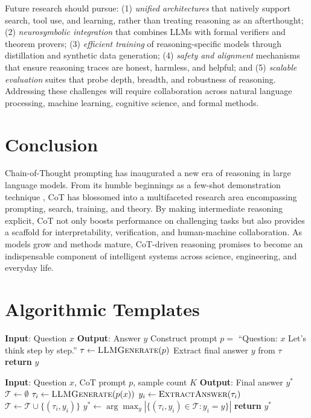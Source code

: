 \documentclass[11pt,a4paper]{article}
\begin{document}
Future research should pursue: (1) \textit{unified architectures} that natively support search, tool use, and learning, rather than treating reasoning as an afterthought; (2) \textit{neurosymbolic integration} that combines LLMs with formal verifiers and theorem provers; (3) \textit{efficient training} of reasoning-specific models through distillation and synthetic data generation; (4) \textit{safety and alignment} mechanisms that ensure reasoning traces are honest, harmless, and helpful; and (5) \textit{scalable evaluation} suites that probe depth, breadth, and robustness of reasoning. Addressing these challenges will require collaboration across natural language processing, machine learning, cognitive science, and formal methods.

\section{Conclusion}
\label{sec:conclusion}
Chain-of-Thought prompting has inaugurated a new era of reasoning in large language models. From its humble beginnings as a few-shot demonstration technique \citep{wei2022chain}, CoT has blossomed into a multifaceted research area encompassing prompting, search, training, and theory. By making intermediate reasoning explicit, CoT not only boosts performance on challenging tasks but also provides a scaffold for interpretability, verification, and human-machine collaboration. As models grow and methods mature, CoT-driven reasoning promises to become an indispensable component of intelligent systems across science, engineering, and everyday life.




\appendix
\section{Algorithmic Templates}
\begin{algorithm}[h]
\caption{Zero-Shot Chain-of-Thought Prompting}
\label{alg:zero-shot-cot}
\begin{algorithmic}[1]
\State \textbf{Input}: Question $x$
\State \textbf{Output}: Answer $y$
\State Construct prompt $p = $ ``Question: $x$ Let's think step by step.''
\State $\tau \gets \textsc{LLMGenerate}(p)$
\State Extract final answer $y$ from $\tau$
\State \textbf{return} $y$
\end{algorithmic}
\end{algorithm}

\begin{algorithm}[h]
\caption{Self-Consistency with Majority Voting}
\label{alg:self-consistency}
\begin{algorithmic}[1]
\State \textbf{Input}: Question $x$, CoT prompt $p$, sample count $K$
\State \textbf{Output}: Final answer $y^*$
\State $\mathcal{T} \gets \emptyset$
  \State $\tau_i \gets \textsc{LLMGenerate}(p(x))$
  \State $y_i \gets \textsc{ExtractAnswer}(\tau_i)$
  \State $\mathcal{T} \gets \mathcal{T} \cup \{(\tau_i, y_i)\}$
\EndFor
\State $y^* \gets \arg\max_{y} |\{(\tau_i, y_i) \in \mathcal{T} : y_i = y\}|$
\State \textbf{return} $y^*$
\end{algorithmic}
\end{algorithm}
\end{document}
